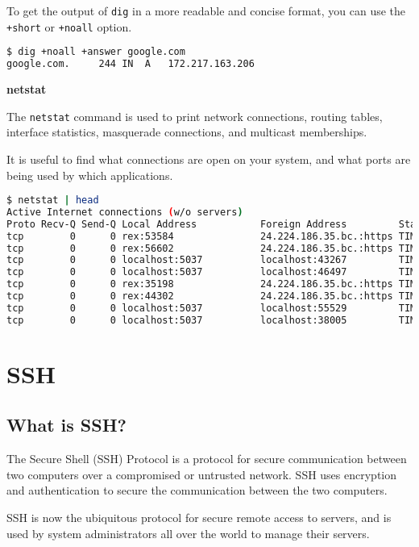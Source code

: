 To get the output of \lstinline|dig| in a more readable
and concise format, you can use the \lstinline|+short|
or \lstinline|+noall| option.

\begin{lstlisting}[language=bash]
$ dig +noall +answer google.com
google.com.		244	IN	A	172.217.163.206
\end{lstlisting}

\textbf{netstat}

The \lstinline|netstat| command is used to print network
connections, routing tables, interface statistics,
masquerade connections, and multicast memberships.

It is useful to find what connections are open on
your system, and what ports are being used by which
applications.

\begin{lstlisting}[language=bash]
$ netstat | head
Active Internet connections (w/o servers)
Proto Recv-Q Send-Q Local Address           Foreign Address         State
tcp        0      0 rex:53584               24.224.186.35.bc.:https TIME_WAIT
tcp        0      0 rex:56602               24.224.186.35.bc.:https TIME_WAIT
tcp        0      0 localhost:5037          localhost:43267         TIME_WAIT
tcp        0      0 localhost:5037          localhost:46497         TIME_WAIT
tcp        0      0 rex:35198               24.224.186.35.bc.:https TIME_WAIT
tcp        0      0 rex:44302               24.224.186.35.bc.:https TIME_WAIT
tcp        0      0 localhost:5037          localhost:55529         TIME_WAIT
tcp        0      0 localhost:5037          localhost:38005         TIME_WAIT
\end{lstlisting}


\vfill
\pagebreak
\section{SSH}
\subsection{What is SSH?}

The Secure Shell (SSH) Protocol is a protocol for secure
communication between two computers over a compromised
or untrusted network.
SSH uses encryption and authentication to secure the
communication between the two computers.

SSH is now the ubiquitous protocol for secure remote
access to servers, and is used by system administrators
all over the world to manage their servers.

